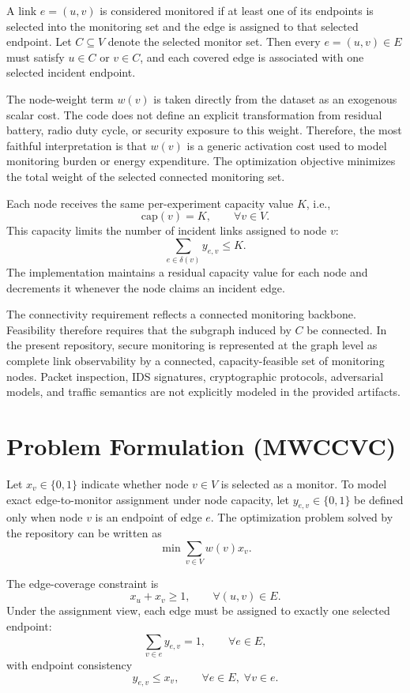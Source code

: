 \documentclass[11pt]{article}
\begin{document}
A link \(e=(u,v)\) is considered monitored if at least one of its endpoints is selected into the monitoring set and the edge is assigned to that selected endpoint. Let \(C\subseteq V\) denote the selected monitor set. Then every \(e=(u,v)\in E\) must satisfy \(u\in C\) or \(v\in C\), and each covered edge is associated with one selected incident endpoint.

The node-weight term \(w(v)\) is taken directly from the dataset as an exogenous scalar cost. The code does not define an explicit transformation from residual battery, radio duty cycle, or security exposure to this weight. Therefore, the most faithful interpretation is that \(w(v)\) is a generic activation cost used to model monitoring burden or energy expenditure. The optimization objective minimizes the total weight of the selected connected monitoring set.

Each node receives the same per-experiment capacity value \(K\), i.e.,
\[
\mathrm{cap}(v)=K,\qquad \forall v\in V.
\]
This capacity limits the number of incident links assigned to node \(v\):
\[
\sum_{e\in \delta(v)} y_{e,v} \le K.
\]
The implementation maintains a residual capacity value for each node and decrements it whenever the node claims an incident edge.

The connectivity requirement reflects a connected monitoring backbone. Feasibility therefore requires that the subgraph induced by \(C\) be connected. In the present repository, secure monitoring is represented at the graph level as complete link observability by a connected, capacity-feasible set of monitoring nodes. Packet inspection, IDS signatures, cryptographic protocols, adversarial models, and traffic semantics are not explicitly modeled in the provided artifacts.

\section{Problem Formulation (MWCCVC)}

Let \(x_v\in\{0,1\}\) indicate whether node \(v\in V\) is selected as a monitor. To model exact edge-to-monitor assignment under node capacity, let \(y_{e,v}\in\{0,1\}\) be defined only when node \(v\) is an endpoint of edge \(e\). The optimization problem solved by the repository can be written as
\[
\min \sum_{v\in V} w(v)x_v.
\]

The edge-coverage constraint is
\[
x_u+x_v\ge 1,\qquad \forall (u,v)\in E.
\]
Under the assignment view, each edge must be assigned to exactly one selected endpoint:
\[
\sum_{v\in e} y_{e,v}=1,\qquad \forall e\in E,
\]
with endpoint consistency
\[
y_{e,v}\le x_v,\qquad \forall e\in E,\; \forall v\in e.
\]
\end{document}
